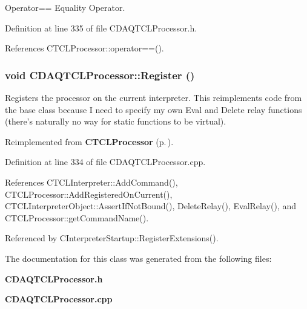 Operator== Equality Operator.



Definition at line 335 of file CDAQTCLProcessor.h.

References CTCLProcessor::operator==().
\subsubsection{\setlength{\rightskip}{0pt plus 5cm}void CDAQTCLProcessor::Register ()\hspace{0.3cm}{\tt  [virtual]}}\label{classCDAQTCLProcessor_a4}


Registers the processor on the current interpreter. This reimplements code from the base class because I need to specify my own Eval and Delete relay  functions (there's naturally no way for static functions to be virtual). 

Reimplemented from {\bf CTCLProcessor} {\rm (p.\,\pageref{classCTCLProcessor_a15})}.

Definition at line 334 of file CDAQTCLProcessor.cpp.

References CTCLInterpreter::Add\-Command(), CTCLProcessor::Add\-Registered\-On\-Current(), CTCLInterpreter\-Object::Assert\-If\-Not\-Bound(), Delete\-Relay(), Eval\-Relay(), and CTCLProcessor::get\-Command\-Name().

Referenced by CInterpreter\-Startup::Register\-Extensions().

The documentation for this class was generated from the following files:\begin{CompactItemize}
\item 
{\bf CDAQTCLProcessor.h}\item 
{\bf CDAQTCLProcessor.cpp}\end{CompactItemize}
